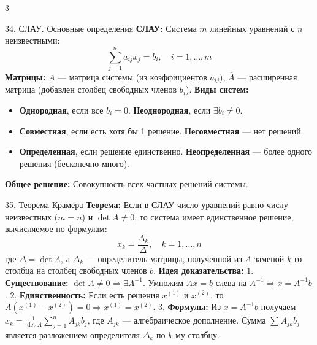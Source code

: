 \documentclass[8pt, a4paper, landscape]{extarticle}
\newcommand{\Ra}{\Rightarrow}
\begin{document}
\begin{multicols*}{3}
\begin{ticket}{34. СЛАУ. Основные определения}
\textbf{СЛАУ:} Система $m$ линейных уравнений с $n$ неизвестными:
\[\sum_{j=1}^n a_{ij}x_j = b_i, \quad i=1,\dots,m\]
\textbf{Матрицы:} $A$ --- матрица системы (из коэффициентов $a_{ij}$), $\overline{A}$ --- расширенная матрица (добавлен столбец свободных членов $b_i$).
\tcblower
\textbf{Виды систем:}
\begin{itemize}
    \item \textbf{Однородная}, если все $b_i = 0$. \textbf{Неоднородная}, если $\exists b_i \neq 0$.
    \item \textbf{Совместная}, если есть хотя бы 1 решение. \textbf{Несовместная} --- нет решений.
    \item \textbf{Определенная}, если решение единственно. \textbf{Неопределенная} --- более одного решения (бесконечно много).
\end{itemize}
\textbf{Общее решение:} Совокупность всех частных решений системы.
\end{ticket}

\begin{ticket}{35. Теорема Крамера}
\textbf{Теорема:} Если в СЛАУ число уравнений равно числу неизвестных ($m=n$) и $\det A \neq 0$, то система имеет единственное решение, вычисляемое по формулам:
\[x_k = \frac{\Delta_k}{\Delta}, \quad k = 1, \dots, n\]
где $\Delta = \det A$, а $\Delta_k$ --- определитель матрицы, полученной из $A$ заменой $k$-го столбца на столбец свободных членов $b$.
\tcblower
\textbf{Идея доказательства:} 
1. \textbf{Существование:} $\det A \neq 0 \Ra \exists A^{-1}$. Умножим $Ax = b$ слева на $A^{-1} \Ra x = A^{-1}b$.
2. \textbf{Единственность:} Если есть решения $x^{(1)}$ и $x^{(2)}$, то $A(x^{(1)} - x^{(2)}) = 0 \Ra x^{(1)} = x^{(2)}$.
3. \textbf{Формулы:} Из $x = A^{-1}b$ получаем $x_k = \frac{1}{\det A} \sum_{j=1}^n A_{jk} b_j$, где $A_{jk}$ --- алгебраическое дополнение. Сумма $\sum A_{jk} b_j$ является разложением определителя $\Delta_k$ по $k$-му столбцу.
\end{ticket}


\end{multicols*}
\end{document}
